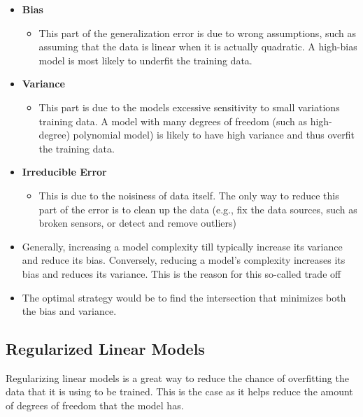 \begin{itemize}
    \item \textbf{Bias}
        \begin{itemize}
            \item This part of the generalization error is due to wrong assumptions, 
            such as assuming that the data is linear when it is actually quadratic. A 
            high-bias model is most likely to underfit the training data.
        \end{itemize}
    \item \textbf{Variance}
        \begin{itemize}
            \item This part is due to the models excessive sensitivity to small variations
                  training data. A model with many degrees of freedom (such as high-degree)
                  polynomial model) is likely to have high variance and thus overfit the 
                  training data.         
        \end{itemize}
    \item \textbf{Irreducible Error}
        \begin{itemize}
            \item This is due to the noisiness of data itself. The only way to reduce this
                  part of the error is to clean up the data (e.g., fix the data sources,
                  such as broken sensors, or detect and remove outliers)
        \end{itemize}
    \item Generally, increasing a model complexity till typically increase its variance
          and reduce its bias. Conversely, reducing a model's complexity increases its bias
          and reduces its variance. This is the reason for this so-called trade off
    \item The optimal strategy would be to find the intersection that minimizes both the 
          bias and variance.
\end{itemize}

\subsection{Regularized Linear Models}

Regularizing linear models is a great way to reduce the chance of overfitting the data that
it is using to be trained. This is the case as it helps reduce the amount of degrees of 
freedom that the model has. \\

